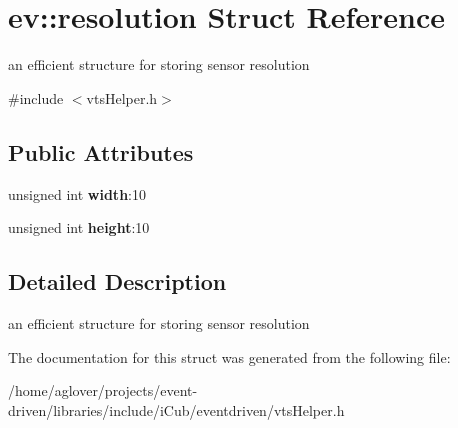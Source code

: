 \hypertarget{structev_1_1resolution}{}\section{ev\+:\+:resolution Struct Reference}
\label{structev_1_1resolution}


an efficient structure for storing sensor resolution  




{\ttfamily \#include $<$vts\+Helper.\+h$>$}

\subsection*{Public Attributes}
\begin{DoxyCompactItemize}
\item 
unsigned int {\bfseries width}\+:10\hypertarget{structev_1_1resolution_af63d9f023bf48b5170fbde6fac1fa60d}{}\label{structev_1_1resolution_af63d9f023bf48b5170fbde6fac1fa60d}

\item 
unsigned int {\bfseries height}\+:10\hypertarget{structev_1_1resolution_ae9919e691ce05e1bbbf281dd79102ddb}{}\label{structev_1_1resolution_ae9919e691ce05e1bbbf281dd79102ddb}

\end{DoxyCompactItemize}


\subsection{Detailed Description}
an efficient structure for storing sensor resolution 

The documentation for this struct was generated from the following file\+:\begin{DoxyCompactItemize}
\item 
/home/aglover/projects/event-\/driven/libraries/include/i\+Cub/eventdriven/vts\+Helper.\+h\end{DoxyCompactItemize}
